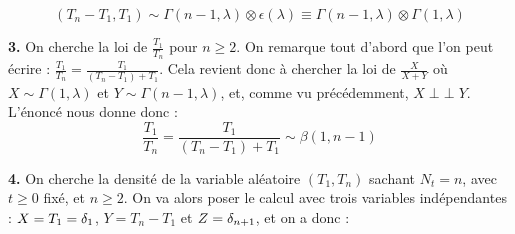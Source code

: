 \documentclass[a4paper,10pt]{report}
\DeclareMathOperator{\ind}{\perp \!\!\! \perp} %
\begin{document}
$$
(T_n - T_1, T_1) \sim \Gamma(n-1,\lambda) \otimes \epsilon(\lambda) \equiv \Gamma(n-1,\lambda) \otimes \Gamma(1,\lambda)
$$
\newline


\textbf{3.} On cherche la loi de $\frac{T_1}{T_n}$ pour $ n \geq 2$. On remarque tout d'abord que l'on peut écrire : $\frac{T_1}{T_n} = \frac{T_1}{(T_n - T_1) + T_1}$. Cela revient donc à chercher la loi de $\frac{X}{X + Y}$ où $X \sim \Gamma(1,\lambda)$ et $Y \sim \Gamma(n-1,\lambda)$, et, comme vu précédemment, $ X \ind Y$. L'énoncé nous donne donc :
$$
\frac{T_1}{T_n} = \frac{T_1}{(T_n - T_1) + T_1} \sim \beta(1,n-1)
$$
\newline


\textbf{4.} On cherche la densité de la variable aléatoire $(T_1,T_n)$ sachant $N_t = n$, avec $t \geq 0$ fixé, et $ n \geq 2$. On va alors poser le calcul avec trois variables indépendantes : $X = T_1 = \var_1$, $Y = T_n - T_1$ et $Z = \var_{n+1}$, et on a donc :
\end{document}
